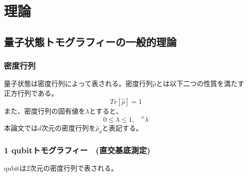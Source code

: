 \documentclass[11pt,a4j,notitlepage]{jreport}
\begin{document}
	\chapter{理論}
	\section{量子状態トモグラフィーの一般的理論}


	\subsection{密度行列}

	量子状態は密度行列によって表される。密度行列$\hat{\rho}$とは以下二つの性質を満たす正方行列である。
	\begin{equation}
		Tr[\hat{\rho}]=1
		\label{eq2.1}
	\end{equation}
	また、密度行列の固有値を$\lambda$とすると、
	\begin{equation}
		0 \leq \lambda \leq 1, \ \ \ \  ^\forall \lambda
		\label{eq2.2}
	\end{equation}
	本論文では$d$次元の密度行列を$\hat{\rho}_d$と表記する。



	\subsection{1 qubitトモグラフィー　(直交基底測定)}

	qubitは$2$次元の密度行列で表される。
\end{document}

